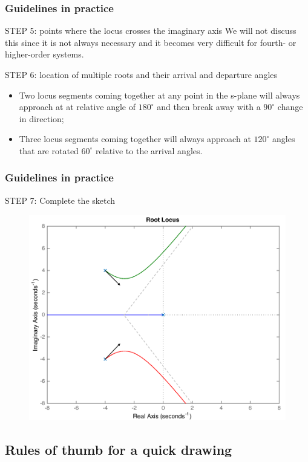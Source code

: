 \begin{frame}
\frametitle{Guidelines in practice}	
	\begin{block}{STEP 5: points where the locus crosses the imaginary axis}
		We will not discuss this since it is not always necessary and it becomes very difficult for fourth- or higher-order systems.
	\end{block}
	\begin{block}{STEP 6: location of multiple roots and their arrival and departure angles}
		\begin{itemize}
		\item Two locus segments coming together at any point in the s-plane will always approach at at relative angle of $180^{\circ}$ and then break away with a $90^{\circ}$ change in direction; 
		\item Three locus segments coming together will always approach at $120^{\circ}$ angles that are rotated $60^{\circ}$ relative to the arrival angles.
	\end{itemize}
	\end{block}
\end{frame}

\begin{frame}
\frametitle{Guidelines in practice}	
	\begin{block}{STEP 7: Complete the sketch}
		\begin{figure}
			\centering
			\includegraphics[width=0.6\linewidth]{how_to_draw_ex5}
		\end{figure}
	\end{block}
\end{frame}

\subsection{Rules of thumb for a quick drawing}

